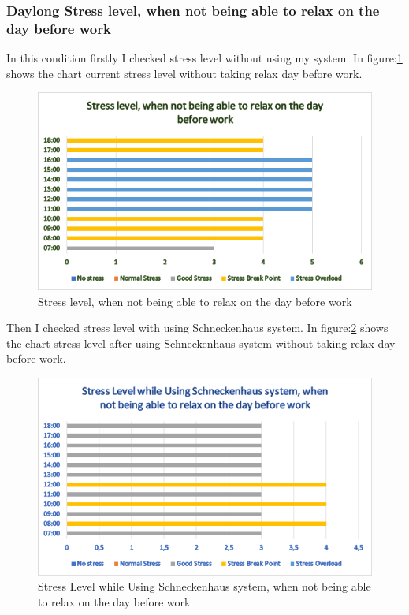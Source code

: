 \subsubsection*{Daylong Stress level, when \textbf{not} being able to relax on the day before work}
In this condition firstly I checked stress level without using my system. In figure:\ref{fig:st2} shows the chart current stress level without taking relax day before work.
\begin{figure}[ht] 
  \centering
  \includegraphics[width=.9\linewidth]{chap5/st2.png}
  \caption[Stress level, when not being able to relax on the day before work]{Stress level, when not being able to relax on the day before work}
  \label{fig:st2}
\end{figure}
Then I checked stress level with using Schneckenhaus system. In figure:\ref{fig:st4} shows the chart stress level after using Schneckenhaus system without taking relax day before work.
\begin{figure}[h] 
  \centering
  \includegraphics[width=.8\linewidth]{chap5/st4.png}
  \caption[Stress Level while Using Schneckenhaus system, when not being able to relax on the day before work
]{Stress Level while Using Schneckenhaus system, when not being able to relax on the day before work
}
  \label{fig:st4}
\end{figure}

